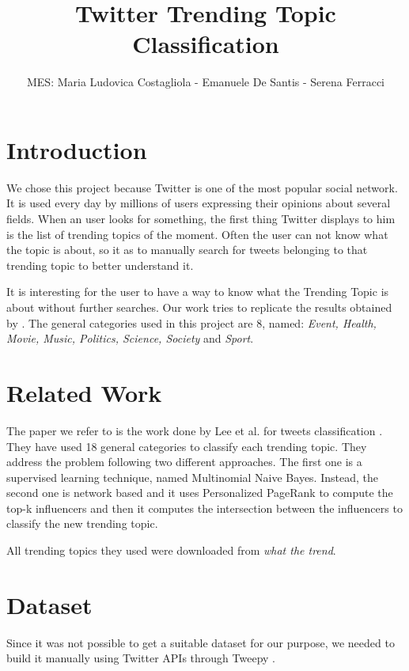 \documentclass[journal,11pt]{vgtc}
\title{Twitter Trending Topic Classification}
\author{MES: Maria Ludovica Costagliola - Emanuele De Santis - Serena Ferracci}
\begin{document}
\maketitle

\section{Introduction}
We chose this project because Twitter is one of the most popular social network. 
It is used every day by millions of users expressing their opinions about several fields.
When an user looks for something, the first thing Twitter displays to him is the list of 
trending topics of the moment. Often the user can not know what the topic is about, so it as to manually 
search for tweets belonging to that trending topic to better understand it.

It is interesting for the user to have a way to know what the Trending Topic is about
without further searches.
Our work tries to replicate the results obtained by \cite{lee_palsetia_narayanan_patwary_agrawal_choudhary_2011}.  
The general categories used in this project are 8, named: \textit{Event, Health, Movie, Music, Politics, Science, Society} and \textit{Sport}.


\section{Related Work}
The paper we refer to is the work done by Lee et al. for tweets classification \cite{lee_palsetia_narayanan_patwary_agrawal_choudhary_2011}. 
They have used 18 general categories to classify each trending topic.
They address the problem following two different approaches. The first one is a supervised learning technique, named
Multinomial Naive Bayes. Instead, the second one is network based and it uses Personalized PageRank to compute the 
top-k influencers and then it computes the intersection between the influencers to classify the new trending topic.

All trending topics they used were downloaded from \textit{what the trend}.

\section{Dataset}
Since it was not possible to get a suitable dataset for our purpose, we needed to build it manually
using Twitter APIs \cite{twitter} through Tweepy \cite{api}.
\end{document}
